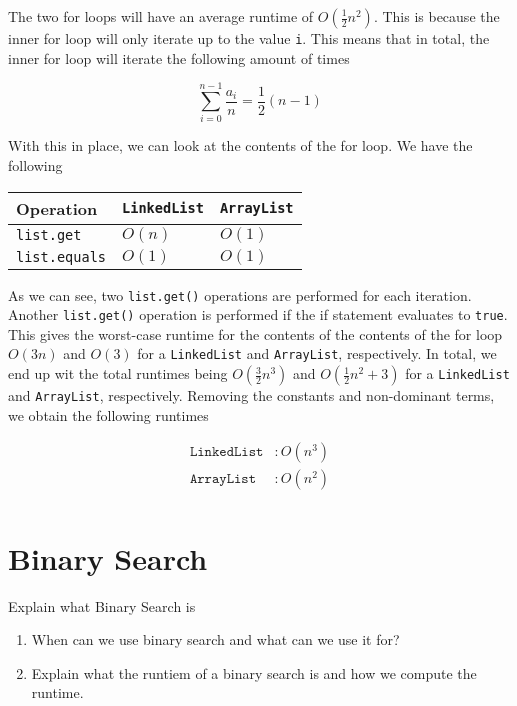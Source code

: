 \documentclass{article}
\begin{document}
    \begin{ans}
        The two for loops will have an average runtime of \( O\left( \frac{1}{2} n^2 \right) \). This is because the inner for loop will only iterate up to the value \texttt{i}. This means that in total, the inner for loop will iterate the following amount of times

        \[ \sum_{i=0}^{n - 1} \frac{a_{i}}{n} = \frac{1}{2} \left( n - 1 \right) \]

        With this in place, we can look at the contents of the for loop. We have the following

        \begin{table}[H]
            \begin{center}
                \begin{tabular}[c]{|l|l|l|}
                    \hline
                    Operation &\texttt{LinkedList}& \texttt{ArrayList} \\
                    \hline
                    \texttt{list.get} & \( O(n) \) & \( O(1) \)\\
                    \texttt{list.equals} & \( O(1) \) & \( O(1) \)\\
                    \hline
                \end{tabular}
            \end{center}
        \end{table}

        As we can see, two \texttt{list.get()} operations are performed for each iteration. Another \texttt{list.get()} operation is performed if the if statement evaluates to \texttt{true}. This gives the worst-case runtime for the contents of the contents of the for loop \( O(3n) \) and \( O(3) \) for a \texttt{LinkedList} and \texttt{ArrayList}, respectively. In total, we end up wit the total runtimes being \( O(\frac{3}{2} n^3) \) and \( O(\frac{1}{2} n^2 + 3) \) for a \texttt{LinkedList} and \texttt{ArrayList}, respectively. Removing the constants and non-dominant terms, we obtain the following runtimes

        \begin{align*}
            \texttt{LinkedList}&: O(n^3)\\
            \texttt{ArrayList}&: O(n^2)\\
        \end{align*}
    \end{ans}

    \section{Binary Search}
    Explain what Binary Search is
    \begin{enumerate}
        \item When can we use binary search and what can we use it for? 
        \item Explain what the runtiem of a binary search is and how we compute the runtime.
    \end{enumerate}
\end{document}
